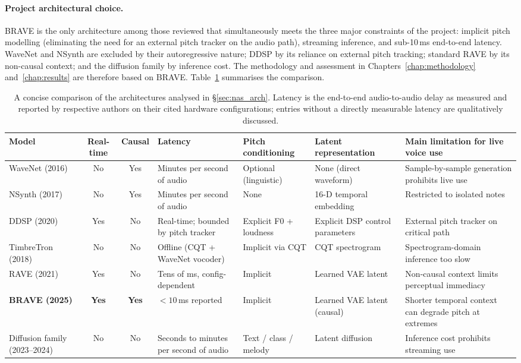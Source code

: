 \documentclass[a4paper,11pt,oneside,openany]{book}
\begin{document}
\paragraph{Project architectural choice.} BRAVE is the only architecture among those reviewed that simultaneously meets the three major constraints of the project: implicit pitch modelling (eliminating the need for an external pitch tracker on the audio path), streaming inference, and sub-10\,ms end-to-end latency. WaveNet and NSynth are excluded by their autoregressive nature; DDSP by its reliance on external pitch tracking; standard RAVE by its non-causal context; and the diffusion family by inference cost. The methodology and assessment in Chapters~\ref{chap:methodology} and~\ref{chap:results} are therefore based on BRAVE. Table~\ref{tab:arch_comparison} summarises the comparison.

\begin{table}[H]
\centering
\caption{A concise comparison of the architectures analysed in \S\ref{sec:nas_arch}. Latency is the end-to-end audio-to-audio delay as measured and reported by respective authors on their cited hardware configurations; entries without a directly measurable latency are qualitatively discussed.}
\label{tab:arch_comparison}
\footnotesize
\setlength{\tabcolsep}{4pt}
\renewcommand{\arraystretch}{1.2}
\begin{tabularx}{\textwidth}{@{}>{\raggedright\arraybackslash}p{2.3cm}ccXXXX@{}}
\toprule
\textbf{Model} & \textbf{Real-time} & \textbf{Causal} & \textbf{Latency} & \textbf{Pitch conditioning} & \textbf{Latent representation} & \textbf{Main limitation for live voice use} \\
\midrule
WaveNet (2016) & No & Yes & Minutes per second of audio & Optional (linguistic) & None (direct waveform) & Sample-by-sample generation prohibits live use \\
NSynth (2017) & No & Yes & Minutes per second of audio & None & 16-D temporal embedding & Restricted to isolated notes \\
DDSP (2020) & Yes & No & Real-time; bounded by pitch tracker & Explicit F0 + loudness & Explicit DSP control parameters & External pitch tracker on critical path \\
TimbreTron (2018) & No & No & Offline (CQT + WaveNet vocoder) & Implicit via CQT & CQT spectrogram & Spectrogram-domain inference too slow \\
RAVE (2021) & Yes & No & Tens of ms, config-dependent & Implicit & Learned VAE latent & Non-causal context limits perceptual immediacy \\
\textbf{BRAVE (2025)} & \textbf{Yes} & \textbf{Yes} & $<10$\,ms reported & Implicit & Learned VAE latent (causal) & Shorter temporal context can degrade pitch at extremes \\
Diffusion family (2023--2024) & No & No & Seconds to minutes per second of audio & Text / class / melody & Latent diffusion & Inference cost prohibits streaming use \\
\bottomrule
\end{tabularx}
\end{table}
\end{document}
